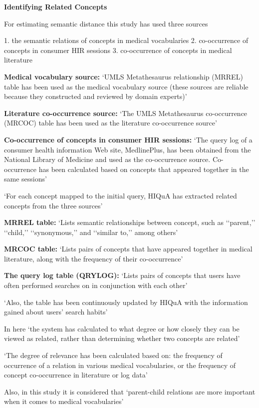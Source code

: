 \documentclass[]{article}
\begin{document}
\textbf{Identifying Related Concepts}

For estimating semantic distance this study has used three sources

1.	the semantic relations of concepts in medical vocabularies
2.	co-occurrence of concepts in consumer HIR sessions
3.	co-occurrence of concepts in medical literature

\textbf{Medical vocabulary source:} ‘UMLS Metathesaurus relationship (MRREL) table has been used as the medical vocabulary source (these sources are reliable because they constructed and reviewed by domain experts)’

\textbf{Literature co-occurrence source:} ‘The UMLS Metathesaurus co-occurrence (MRCOC) table has been used as the literature co-occurrence source’

\textbf{Co-occurrence of concepts in consumer HIR sessions:} ‘The query log of a consumer health information Web site, MedlinePlus, has been obtained from the National Library of Medicine and used as the co-occurrence source. Co-occurrence has been calculated based on concepts that appeared together in the same sessions’

‘For each concept mapped to the initial query, HIQuA has extracted related concepts from the three sources’

\textbf{MRREL table:} ‘Lists semantic relationships between concept, such as ‘‘parent,’’ ‘‘child,’’ ‘‘synonymous,’’ and ‘‘similar to,’’ among others’

\textbf{MRCOC table:} ‘Lists pairs of concepts that have appeared together in medical literature, along with the frequency of their co-occurrence’

\textbf{The query log table (QRYLOG):} ‘Lists pairs of concepts that users have often performed searches on in conjunction with each other’

‘Also, the table has been continuously updated by HIQuA with the information gained about users’ search habits’

In here ‘the system has calculated to what degree or how closely they can be viewed as related, rather than determining whether two concepts are related’

‘The degree of relevance has been calculated based on: the frequency of occurrence of a relation in various medical vocabularies, or the frequency of concept co-occurrence in literature or log data’

Also, in this study it is considered that ‘parent-child relations are more important when it comes to medical vocabularies’
\end{document}
